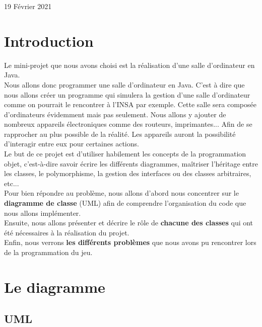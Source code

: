 \documentclass[12,french]{report}
\begin{document}
\begin{titlepage}
\begin{center}
	\vfill
	{\large 19 Février 2021}
\end{center}
\end{titlepage}

\tableofcontents


\renewcommand{\chaptername}{}
\chapter*{Introduction}

Le mini-projet que nous avons choisi est la réalisation d'une salle d'ordinateur en Java.\\

Nous allons donc programmer une salle d'ordinateur en Java. C'est à dire que nous allons créer un programme qui simulera la gestion d'une salle d'ordinateur comme on pourrait le rencontrer à l'INSA par exemple. Cette salle sera composée d'ordinateurs évidemment mais pas seulement. Nous allons y ajouter de nombreux appareils électroniques comme des routeurs, imprimantes... Afin de se rapprocher au plus possible de la réalité. Les appareils auront la possibilité d'interagir entre eux pour certaines actions. \\

Le but de ce projet est d'utiliser habilement les concepts de la programmation objet, c'est-à-dire savoir écrire les différents diagrammes, maîtriser l'héritage entre les classes, le polymorphisme, la gestion des interfaces ou des classes arbitraires, etc...\\

Pour bien répondre au problème, nous allons d'abord nous concentrer sur le \textbf{diagramme de classe} (UML) afin de comprendre l'organisation du code que nous allons implémenter.\\

Ensuite, nous allons présenter et décrire le rôle de \textbf{chacune des classes} qui ont été nécessaires à la réalisation du projet.\\

Enfin, nous verrons \textbf{les différents problèmes} que nous avons pu rencontrer lors de la programmation du jeu.


\chapter{Le diagramme}

\section{UML}
\end{document}
